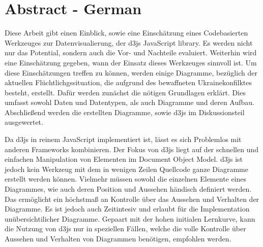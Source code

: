 \chapter*{Abstract - German} %



Diese Arbeit gibt einen Einblick, sowie eine Einschätzung eines Codebasierten Werkzeuges zur Datenvisualierung, der d3js JavaScript library. Es werden nicht nur das Potential, sondern auch die Vor- und Nachteile evaluiert. Weiterhin wird eine Einschätzung gegeben, wann der Einsatz dieses Werkzeuges sinnvoll ist. Um diese Einschätzungen treffen zu können, werden einige Diagramme, bezüglich der aktuellen Flüchtlichgssituation, die aufgrund des bewaffneten Ukrainekonfilktes besteht, erstellt. Dafür werden zunächst die nötigen Grundlagen erklärt. Dies umfasst sowohl Daten und Datentypen, als auch Diagramme und deren Aufbau. Abschließend werden die erstellten Diagramme, sowie d3js im Diskussionsteil ausgewertet.

Da d3js in reinem JavaScript implementiert ist, lässt es sich Problemlos mit anderen Frameworks kombinieren. Der Fokus von d3js liegt auf der schnellen und einfachen Manipulation von Elementen im Document Object Model. d3js ist jedoch kein Werkzeug mit dem in wenigen Zeilen Quellcode ganze Diagramme erstellt werden können. Vielmehr müssen sowohl die einzelnen Elemente eines Diagrammes, wie auch deren Position und Aussehen händisch definiert werden. Das ermöglicht ein höchstmaß an Kontrolle über das Aussehen und Verhalten der Diagramme. Es ist jedoch auch Zeitintesiv und erlaubt für die Implementation unübersichtilicher Diagramme. Gepaart mit der hohen initialen Lernkurve, kann die Nutzung von d3js nur in speziellen Fällen, welche die volle Kontrolle über Aussehen und Verhalten von Diagrammen benötigen, empfohlen werden.